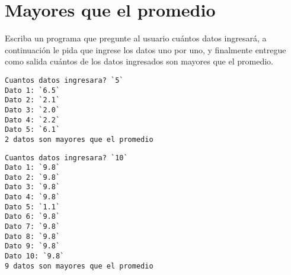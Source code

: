 \section{Mayores que el promedio}

Escriba un programa que pregunte al usuario cuántos datos ingresará, a
continuación le pida que ingrese los datos uno por uno, y finalmente
entregue como salida cuántos de los datos ingresados son mayores que el
promedio.

\begin{lstlisting}[language=testcase]
Cuantos datos ingresara? `5`
Dato 1: `6.5`
Dato 2: `2.1`
Dato 3: `2.0`
Dato 4: `2.2`
Dato 5: `6.1`
2 datos son mayores que el promedio
\end{lstlisting}

\begin{lstlisting}[language=testcase]
Cuantos datos ingresara? `10`
Dato 1: `9.8`
Dato 2: `9.8`
Dato 3: `9.8`
Dato 4: `9.8`
Dato 5: `1.1`
Dato 6: `9.8`
Dato 7: `9.8`
Dato 8: `9.8`
Dato 9: `9.8`
Dato 10: `9.8`
9 datos son mayores que el promedio
\end{lstlisting}

